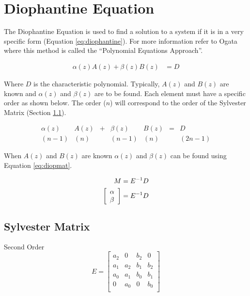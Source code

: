 \documentclass{article}
\begin{document}
\section{Diophantine Equation}

The Diophantine Equation is used to find a solution to a system
if it is in a very specific form (Equation \ref{eq:diophantine}).
For more information refer to Ogata\autocite[Pg. 525]{ogata1995discrete}
where this method is called the ``Polynomial Equations Approach''.

\begin{align}
	\alpha(z)A(z) + \beta(z)B(z) &= D \label{eq:diophantine}
\end{align}

Where $D$ is the characteristic polynomial.
Typically, $A(z)$ and $B(z)$ are known and $\alpha(z)$ and $\beta(z)$
are to be found.
Each element must have a specific order as shown below.
The order ($n$) will correspond to the order of the
Sylvester Matrix (Section \ref{sec:sylvester}).

\[
\begin{array}{ccccccc}
	\alpha(z) &A(z) &+ &\beta(z) &B(z) &= &D \\
	  (n-1)   &(n)  &  & (n-1)  &(n) & &(2n-1)
\end{array}
\]

When $A(z)$ and $B(z)$ are known $\alpha(z)$ and $\beta(z)$
can be found using Equation \ref{eq:diopmat}.

\begin{align}
	M &= E^{-1} D \label{eq:diopmat} \\
	\left[
	\begin{array}{l}
		\alpha \\
		\beta
	\end{array}
	\right] &= E^{-1} D \notag
\end{align}

\subsection{Sylvester Matrix}
\label{sec:sylvester}

Second Order
\[
E=
\begin{bmatrix}
	a_2 & 0 & b_2 & 0 \\
	a_1 & a_2 & b_1 & b_2 \\
	a_0 & a_1 & b_0 & b_1 \\
	0 & a_0 & 0 & b_0 \\
\end{bmatrix}
\]
\end{document}
